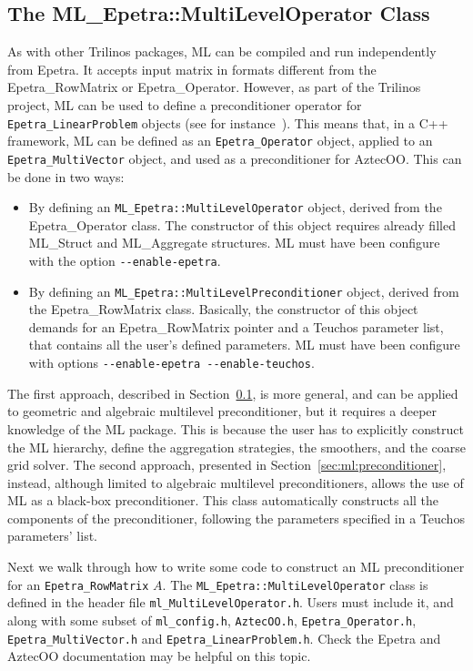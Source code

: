 \subsection{The ML\_Epetra::MultiLevelOperator Class}
\label{sec:ml:operator}
As with other Trilinos packages, ML can be compiled and run independently
from Epetra. It accepts input matrix in formats different
from the Epetra\_RowMatrix or Epetra\_Operator. However, as part of the
Trilinos project, ML can be used to define a preconditioner operator for
\verb!Epetra_LinearProblem! objects (see for
instance~\cite{Epetra-Ref-Guide}). This means that, in a C++ framework,
ML can be defined as an \verb!Epetra_Operator! object, applied to an
\verb!Epetra_MultiVector!  object, and used as a preconditioner for
AztecOO.  This can be done in two ways:
\begin{itemize}
\item By defining an \verb!ML_Epetra::MultiLevelOperator! object, derived from the
  Epetra\_Operator class. The constructor of this object requires
  already filled ML\_Struct and ML\_Aggregate structures.  ML must have
  been configure with the option \newline \verb!--enable-epetra!.
\item By defining an \verb!ML_Epetra::MultiLevelPreconditioner! object, derived
  from the Epetra\_RowMatrix class. Basically, the constructor of
  this object demands for an Epetra\_RowMatrix  pointer and a
  Teuchos parameter list, that contains all the user's defined
  parameters. ML must have been configure with options \newline
  \verb!--enable-epetra --enable-teuchos!.
\end{itemize}

The first approach, described in Section~\ref{sec:ml:operator}, is more
general, and can be applied to geometric and algebraic multilevel
preconditioner, but it requires a deeper knowledge of the ML package.
This is because the user has to explicitly construct the ML hierarchy,
define the aggregation strategies, the smoothers, and the coarse grid
solver. The second approach, presented in
Section~\ref{sec:ml:preconditioner}, instead, although limited to algebraic
multilevel preconditioners, allows the use of ML as a black-box
preconditioner. This class automatically constructs all the components
of the preconditioner, following the parameters specified in a Teuchos
parameters' list. 

Next we walk through how to write some code to
construct an ML preconditioner for an \verb!Epetra_RowMatrix! $A$.
The \verb!ML_Epetra::MultiLevelOperator! class 
is defined in the header file \verb!ml_MultiLevelOperator.h!.
Users must include it, and along with some subset of
\verb!ml_config.h!,
\verb!AztecOO.h!,
\verb!Epetra_Operator.h!, 
\verb!Epetra_MultiVector.h!
and
\verb!Epetra_LinearProblem.h!.
Check the Epetra and AztecOO documentation may be helpful on this topic.

